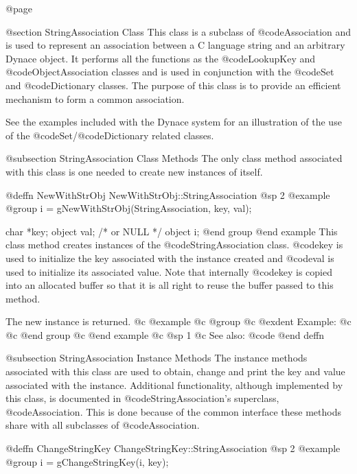 @page

@section StringAssociation Class
This class is a subclass of @code{Association} and is used to
represent an association between a C language string and an arbitrary
Dynace object.  It performs all the functions as the @code{LookupKey}
and @code{ObjectAssociation} classes and is used in conjunction with the
@code{Set} and @code{Dictionary} classes.  The purpose of this class is
to provide an efficient mechanism to form a common association.


See the examples included with the Dynace system for an illustration of the
use of the @code{Set}/@code{Dictionary} related classes.


@subsection StringAssociation Class Methods
The only class method associated with this class is one needed to create
new instances of itself.






@deffn {NewWithStrObj} NewWithStrObj::StringAssociation
@sp 2
@example
@group
i = gNewWithStrObj(StringAssociation, key, val);

char    *key;
object  val;    /*  or NULL   */
object  i;
@end group
@end example
This class method creates instances of the @code{StringAssociation}
class.  @code{key} is used to initialize the key associated with the
instance created and @code{val} is used to initialize its associated
value.  Note that internally @code{key} is copied into an allocated
buffer so that it is all right to reuse the buffer passed to this
method.

The new instance is returned.
@c @example
@c @group
@c @exdent Example:
@c 
@c @end group
@c @end example
@c @sp 1
@c See also:  @code{}
@end deffn



@subsection StringAssociation Instance Methods
The instance methods associated with this class are used to obtain,
change and print the key and value associated with the instance.
Additional functionality, although implemented by this class, is documented
in @code{StringAssociation}'s superclass, @code{Association}.  This is done
because of the common interface these methods share with all subclasses
of @code{Association}.












@deffn {ChangeStringKey} ChangeStringKey::StringAssociation
@sp 2
@example
@group
i = gChangeStringKey(i, key);

